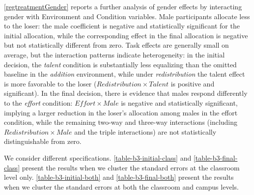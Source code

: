 \documentclass[11pt]{article}
\begin{document}
{\autoref{regtreatmentGender} reports a further analysis of gender effects by interacting gender with Environment and Condition variables. Male participants allocate less to the loser: the male coefficient is negative and statistically significant for the initial allocation, while the corresponding effect in the final allocation is negative but not statistically different from zero. Task effects are generally small on average, but the interaction patterns indicate heterogeneity: in the initial decision, the \emph{talent} condition is substantially less equalizing than the omitted baseline in the \emph{addition} environment, while under \emph{redistribution} the talent effect is more favorable to the loser ($Redistribution \times Talent$ is positive and significant). In the final decision, there is evidence that males respond differently to the \emph{effort} condition: $Effort \times Male$ is negative and statistically significant, implying a larger reduction in the loser’s allocation among males in the effort condition, while the remaining two-way and three-way interactions (including $Redistribution \times Male$ and the triple interactions) are not statistically distinguishable from zero.








\bigskip



 \par \medskip

We consider different specifications. \autoref{table-b3-initial-class} and \autoref{table-b3-final-class} present the results when we cluster the standard errors at the classroom level only. \autoref{table-b3-initial-both} and \autoref{table-b3-final-both} present the results when we cluster the standard errors at both the classroom and campus levels.







\newpage






 \par \medskip
 
}
\end{document}

